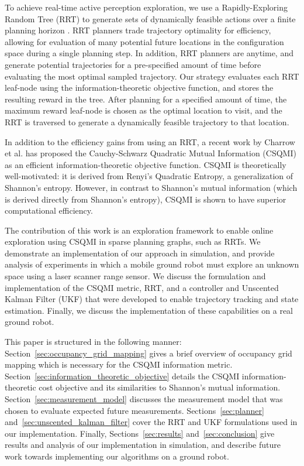 To achieve real-time active perception exploration, we use a Rapidly-Exploring Random Tree
(RRT) to generate sets of dynamically feasible actions over a finite planning horizon
\cite{Kuwata09_TCST}. RRT planners trade trajectory optimality for efficiency, allowing for evaluation
of many potential future locations in the configuration space during a single planning
step. In addition, RRT planners are anytime, and generate potential trajectories
for a pre-specified amount of time before evaluating the most optimal sampled trajectory. Our
strategy evaluates each RRT leaf-node using the information-theoretic objective function,
and stores the resulting reward in the tree. After planning for a specified
amount of time, the maximum reward leaf-node is chosen as the optimal location to
visit, and the RRT is traversed to generate a dynamically feasible trajectory to
that location.

In addition to the efficiency gains from using an RRT, a recent work by Charrow
et al. \cite{charrow15} has
proposed the Cauchy-Schwarz Quadratic Mutual Information (CSQMI) as an efficient
information-theoretic objective function. CSQMI is theoretically
well-motivated: it is derived from Renyi's Quadratic Entropy, a generalization of Shannon's entropy.
However, in contrast to Shannon's mutual information (which is derived directly
from Shannon's entropy), CSQMI is shown to have superior computational efficiency.

The contribution of this work is an exploration framework to enable online exploration using CSQMI in sparse
planning graphs, such as RRTs. We demonstrate an implementation of our approach
in simulation, and provide analysis of experiments in which a mobile ground
robot must explore an unknown space using a laser scanner range sensor. We discuss the
formulation and implementation of the CSQMI metric, RRT, and a controller and
Unscented Kalman Filter (UKF) that were developed to enable trajectory tracking and
state estimation. Finally, we discuss the implementation of these capabilities
on a real ground robot.

This paper is structured in the following manner: Section~\ref{sec:occupancy_grid_mapping}
gives a brief overview of occupancy grid mapping which is necessary for the CSQMI
information metric. Section~\ref{sec:information_theoretic_objective}
details the CSQMI information-theoretic cost objective and its similarities to
Shannon's mutual information. Section~\ref{sec:measurement_model} discusses the
measurement model that was chosen to evaluate expected future measurements.
Sections~\ref{sec:planner} and~\ref{sec:unscented_kalman_filter} cover the RRT and UKF formulations
used in our implementation. Finally, Sections~\ref{sec:results}
and~\ref{sec:conclusion} give results and analysis of our implementation in
simulation, and describe future work towards implementing our algorithms on a
ground robot.
